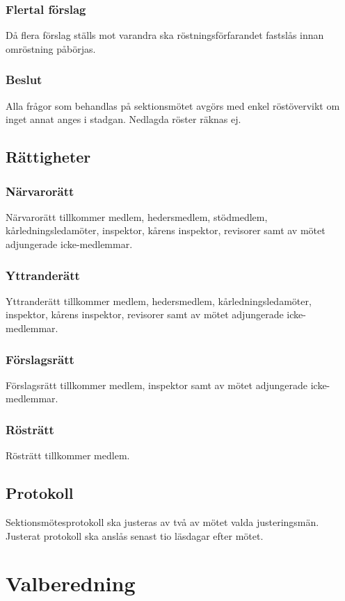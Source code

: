 \documentclass[a4paper]{dtek}
\begin{document}
\subsubsection{Flertal förslag}
Då flera förslag ställs mot varandra ska röstningsförfarandet fastslås innan omröstning påbörjas.
\subsubsection{Beslut}
Alla frågor som behandlas på sektionsmötet avgörs med enkel röstövervikt om inget annat anges i stadgan. Nedlagda röster räknas ej.
\subsection{Rättigheter}
\subsubsection{Närvarorätt}
Närvarorätt tillkommer medlem, hedersmedlem, stödmedlem, kårledningsledamöter, inspektor, kårens inspektor, revisorer samt av mötet adjungerade icke-medlemmar.
\subsubsection{Yttranderätt}
Yttranderätt tillkommer medlem, hedersmedlem, kårledningsledamöter, inspektor, kårens inspektor, revisorer samt av mötet adjungerade icke-medlemmar.
\subsubsection{Förslagsrätt}
Förslagsrätt tillkommer medlem, inspektor samt av mötet adjungerade icke-medlemmar.
\subsubsection{Rösträtt}
Rösträtt tillkommer medlem.
\subsection{Protokoll}
Sektionsmötesprotokoll ska justeras av två av mötet valda justeringsmän. Justerat protokoll ska anslås senast tio läsdagar efter mötet.
\newpage

\section{Valberedning}
\label{sec:valberedning}
\end{document}
